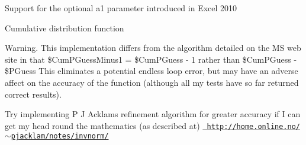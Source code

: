 
\begin{DoxyRefList}
\item[Global \mbox{\hyperlink{class_p_h_p_excel___calculation___lookup_ref_a8e3ba6fde550688e901f39972e176e33}{P\+H\+P\+Excel\+\_\+\+Calculation\+\_\+\+Lookup\+Ref::I\+N\+D\+I\+R\+E\+CT}} (\$cell\+Address=null, \mbox{\hyperlink{class_p_h_p_excel___cell}{P\+H\+P\+Excel\+\_\+\+Cell}} \$p\+Cell=null)]\label{todo__todo000001}%
%
Support for the optional a1 parameter introduced in Excel 2010 
\item[Global \mbox{\hyperlink{class_p_h_p_excel___calculation___statistical_a2d512325cf54e00e45f1fe6c62e62ed0}{P\+H\+P\+Excel\+\_\+\+Calculation\+\_\+\+Statistical::B\+I\+N\+O\+M\+D\+I\+ST}} (\$value, \$trials, \$probability, \$cumulative)]\label{todo__todo000002}%
%
Cumulative distribution function 
\item[Global \mbox{\hyperlink{class_p_h_p_excel___calculation___statistical_a570e7dee13d02899c2db794dcb986332}{P\+H\+P\+Excel\+\_\+\+Calculation\+\_\+\+Statistical::C\+R\+I\+T\+B\+I\+N\+OM}} (\$trials, \$probability, \$alpha)]\label{todo__todo000003}%
%
Warning. This implementation differs from the algorithm detailed on the MS web site in that \$\+Cum\+P\+Guess\+Minus1 = \$\+Cum\+P\+Guess -\/ 1 rather than \$\+Cum\+P\+Guess -\/ \$\+P\+Guess This eliminates a potential endless loop error, but may have an adverse affect on the accuracy of the function (although all my tests have so far returned correct results). 
\item[Global \mbox{\hyperlink{class_p_h_p_excel___calculation___statistical_a13e34b9b0980c958ca59f897a4d8edb6}{P\+H\+P\+Excel\+\_\+\+Calculation\+\_\+\+Statistical::L\+O\+G\+I\+NV}} (\$probability, \$mean, \$std\+Dev)]\label{todo__todo000004}%
%
Try implementing P J Acklam\textquotesingle{}s refinement algorithm for greater accuracy if I can get my head round the mathematics (as described at) \href{http://home.online.no/~pjacklam/notes/invnorm/}{\texttt{ http\+://home.\+online.\+no/$\sim$pjacklam/notes/invnorm/}} 
\end{DoxyRefList}